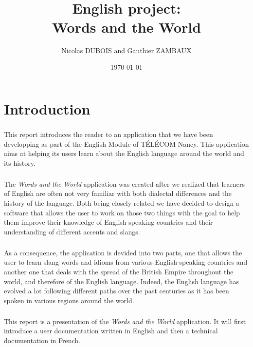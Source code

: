 \documentclass[11pt, a4paper]{report}
\title{English project:\\Words and the World}
\author{Nicolas DUBOIS and Gauthier ZAMBAUX}
\date{\today}
\begin{document}
\maketitle


\chapter*{Introduction}
\paragraph{}This report introduces the reader to an application that we have been developping as part of the English Module of TÉLÉCOM Nancy. This application aims at helping its users learn about the English language around the world and its history.

\paragraph{}The \textit{Words and the World} application was created after we realized that learners of English are often not very familiar with both dialectal differences and the history of the language. Both being closely related we have decided to design a software that allows the user to work on those two things with the goal to help them improve their knowledge of English-speaking countries and their understanding of different accents and slangs.

\paragraph{}As a consequence, the application is devided into two parts, one that allows the user to learn slang words and idioms from various English-speaking countries and another one that deals with the spread of the British Empire throughout the world, and therefore of the English language. Indeed, the English language has evolved a lot following different paths over the past centuries as it has been spoken in various regions around the world.

\paragraph{}This report is a presentation of the \textit{Words and the World} application. It will first introduce a user documentation written in English and then a technical documentation in French.
\end{document}
